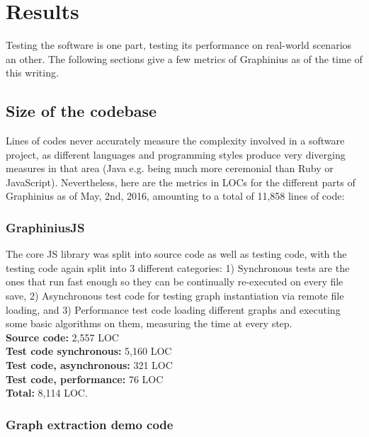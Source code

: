 \chapter{Results}
\label{ch:results_discussion}

Testing the software is one part, testing its performance on real-world scenarios an other. The following sections give a few metrics of Graphinius as of the time of this writing.

\section{Size of the codebase}
\label{sect:complexity}

Lines of codes never accurately measure the complexity involved in a software project, as different languages and programming styles produce very diverging measures in that area (Java e.g. being much more ceremonial than Ruby or JavaScript). Nevertheless, here are the metrics in LOCs for the different parts of Graphinius as of May, 2nd, 2016, amounting to a total of 11,858 lines of code:

	\subsection{GraphiniusJS}
	\label{ssect:metrics_graphinius_js}
	
	The core JS library was split into source code as well as testing code, with the testing code again split into 3 different categories: 1) Synchronous tests are the ones that run fast enough so they can be continually re-executed on every file save, 2) Asynchronous test code for testing graph instantiation via remote file loading, and 3) Performance test code loading different graphs and executing some basic algorithms on them, measuring the time at every step.\\
	\textbf{Source code:} 2,557 LOC \\
	\textbf{Test code synchronous:} 5,160 LOC \\
	\textbf{Test code, asynchronous:} 321 LOC \\
	\textbf{Test code, performance:} 76 LOC \\	
	\textbf{Total:} 8,114 LOC.
	
	\subsection{Graph extraction demo code}
	\label{ssect:metrics_graphinius_graph_ext}
	
